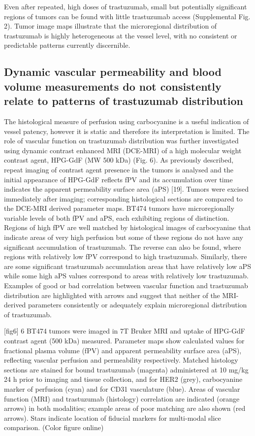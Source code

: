 Even after repeated, high doses of trastuzumab, small but potentially significant regions of tumors can be found with little trastuzumab access (Supplemental Fig.
2).
Tumor image maps illustrate that the microregional distribution of trastuzumab is highly heterogeneous at the vessel level, with no consistent or predictable patterns currently discernible.

\subsection{Dynamic vascular permeability and blood volume measurements do not consistently relate to patterns of trastuzumab distribution}

The histological measure of perfusion using carbocyanine is a useful indication of vessel patency, however it is static and therefore its interpretation is limited.
The role of vascular function on trastuzumab distribution was further investigated using dynamic contrast enhanced MRI (DCE-MRI) of a high molecular weight contrast agent, HPG-GdF (MW 500 kDa) (Fig.
6).
As previously described, repeat imaging of contrast agent presence in the tumors is analysed and the initial appearance of HPG-GdF reflects fPV and its accumulation over time indicates the apparent permeability surface area (aPS) [19].
Tumors were excised immediately after imaging; corresponding histological sections are compared to the DCE-MRI derived parameter maps.
BT474 tumors have microregionally variable levels of both fPV and aPS, each exhibiting regions of distinction.
Regions of high fPV are well matched by histological images of carbocyanine that indicate areas of very high perfusion but some of these regions do not have any significant accumulation of trastuzumab.
The reverse can also be found, where regions with relatively low fPV correspond to high trastuzumab.
Similarly, there are some significant trastuzumab accumulation areas that have relatively low aPS while some high aPS values correspond to areas with relatively low trastuzumab.
Examples of good or bad correlation between vascular function and trastuzumab distribution are highlighted with arrows and suggest that neither of the MRI-derived parameters consistently or adequately explain microregional distribution of trastuzumab.

[fig6]
6
BT474 tumors were imaged in 7T Bruker MRI and uptake of HPG-GdF contrast agent (500 kDa) measured.
Parameter maps show calculated values for fractional plasma volume (fPV) and apparent permeability surface area (aPS), reflecting vascular perfusion and permeability respectively.
Matched histology sections are stained for bound trastuzumab (magenta) administered at 10 mg/kg 24 h prior to imaging and tissue collection, and for HER2 (grey), carbocyanine marker of perfusion (cyan) and for CD31 vasculature (blue).
Areas of vascular function (MRI) and trastuzumab (histology) correlation are indicated (orange arrows) in both modalities; example areas of poor matching are also shown (red arrows).
Stars indicate location of fiducial markers for multi-modal slice comparison.
(Color figure online)

